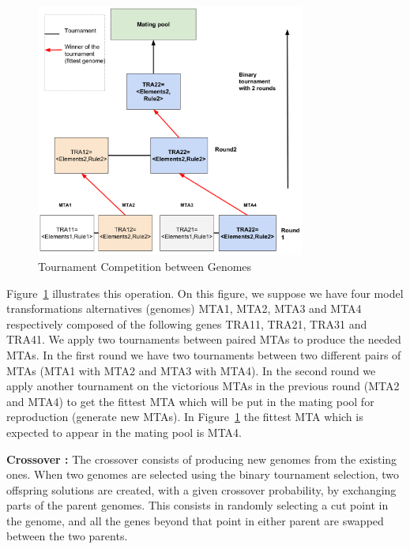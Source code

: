\documentclass[conference]{IEEEtran}
\begin{document}
\begin{figure}[!ht]
\centering
\includegraphics[width=3.49in]{bt.pdf}
\caption{Tournament Competition between Genomes}
\label{binary}
\end{figure}

Figure~\ref{binary} illustrates this operation. On this figure, we suppose we have four model transformations alternatives (genomes) MTA1, MTA2, MTA3 and MTA4 respectively composed of the following genes TRA11, TRA21, TRA31 and TRA41. We apply two tournaments between paired MTAs to produce the needed MTAs. In the first round we have two tournaments between two different pairs of MTAs (MTA1 with MTA2 and MTA3 with MTA4). In the second round we apply another tournament on the victorious MTAs in the previous round (MTA2 and MTA4) to get the fittest MTA which will be put in the mating pool for reproduction (generate new MTAs). In Figure~\ref{binary} the fittest MTA which is expected to appear in the mating pool is MTA4.

\textbf{Crossover :} 
The crossover consists of producing new genomes from the existing ones. When two genomes are selected using the binary tournament selection, two offspring solutions are created, with a given crossover probability, by exchanging parts of the parent genomes. This consists in randomly selecting a cut point in the genome, and all the genes beyond that point in either parent are swapped between the two parents.
\end{document}
